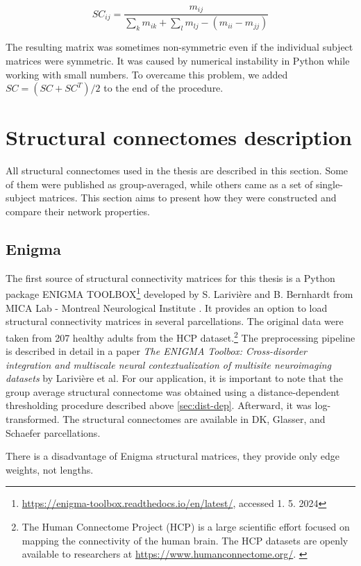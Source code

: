 $$
SC_{ij} = \frac{m_{ij}}{\sum_k m_{ik} + \sum_l m_{lj} - (m_{ii} - m_{jj})}
$$

The resulting matrix was sometimes non-symmetric even if the individual subject matrices were symmetric. It was caused by numerical instability in Python while working with small numbers. To overcame this problem, we added $SC = (SC + SC^T) /2$ to the end of the procedure.

\section{Structural connectomes description}

All structural connectomes used in the thesis are described in this section. Some of them were published as group-averaged, while others came as a set of single-subject matrices. This section aims to present how they were constructed and compare their network properties.

\subsection{Enigma}

The first source of structural connectivity matrices for this thesis is a Python package ENIGMA TOOLBOX\footnote{\url{https://enigma-toolbox.readthedocs.io/en/latest/}, accessed 1. 5. 2024} developed by S. Larivière and B. Bernhardt from MICA Lab - Montreal Neurological Institute \cite{lariviere_enigma_2020}. It provides an option to load structural connectivity matrices in several parcellations. The original data were taken from 207 healthy adults from the HCP dataset.\footnote{The Human Connectome Project (HCP) is a large scientific effort focused on mapping the connectivity of the human brain. The HCP datasets are openly available to researchers at \url{https://www.humanconnectome.org/}. \cite{van_essen_human_2012}} The preprocessing pipeline is described in detail in a paper \textit{The ENIGMA Toolbox: Cross-disorder integration and multiscale neural contextualization of multisite neuroimaging datasets} by Larivière et al. For our application, it is important to note that the group average structural connectome was obtained using a distance-dependent thresholding procedure described above \ref{sec:dist-dep}. Afterward, it was log-transformed. The structural connectomes are available in DK, Glasser, and Schaefer parcellations. 

There is a disadvantage of Enigma structural matrices, they provide only edge weights, not lengths. 

